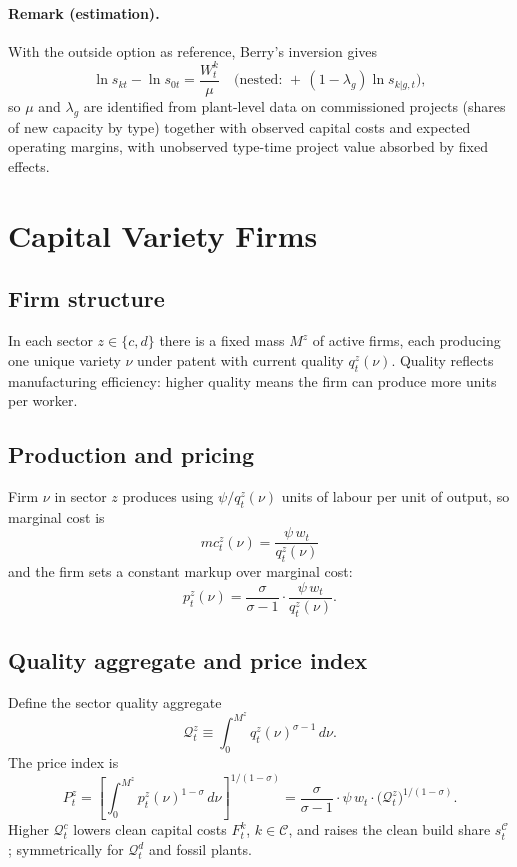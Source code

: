 \documentclass[12pt]{article}
\begin{document}
\paragraph{Remark (estimation).}
With the outside option as reference, Berry's inversion gives
\[
\ln s_{kt}-\ln s_{0t}
=\frac{W^k_t}{\mu}
\quad\Big(\text{nested: }+\,(1-\lambda_g)\ln s_{k|g,t}\Big),
\]
so $\mu$ and $\lambda_g$ are identified from plant-level data on
commissioned projects (shares of new capacity by type) together with
observed capital costs and expected operating margins, with unobserved
type-time project value absorbed by fixed effects.

\section{Capital Variety Firms}\label{sec:varieties}

\subsection{Firm structure}

In each sector $z\in\{c,d\}$ there is a fixed mass $M^z$ of active
firms, each producing one unique variety $\nu$ under patent with current
quality $q^z_t(\nu)$. Quality reflects manufacturing efficiency: higher
quality means the firm can produce more units per worker.

\subsection{Production and pricing}

Firm $\nu$ in sector $z$ produces using $\psi/q^z_t(\nu)$ units of labour
per unit of output, so marginal cost is
\[
mc^z_t(\nu) = \frac{\psi\,w_t}{q^z_t(\nu)}
\]
and the firm sets a constant markup over marginal cost:
\[
p^z_t(\nu) = \frac{\sigma}{\sigma-1}\cdot\frac{\psi\,w_t}{q^z_t(\nu)} .
\]

\subsection{Quality aggregate and price index}

Define the sector quality aggregate
\[
\mathcal Q^z_t\equiv\int_0^{M^z} q^z_t(\nu)^{\sigma-1}\,d\nu .
\]
The price index is
\[
P^z_t = \left[\int_0^{M^z}
p^z_t(\nu)^{1-\sigma}\,d\nu\right]^{1/(1-\sigma)}
=\frac{\sigma}{\sigma-1}\cdot\psi\,w_t\cdot
\big(\mathcal Q^z_t\big)^{1/(1-\sigma)} .
\]
Higher $\mathcal Q^c_t$ lowers clean capital costs $F^k_t$,
$k\in\mathcal C$, and raises the clean build share
$s^{\mathcal C}_t$; symmetrically for $\mathcal Q^d_t$ and fossil
plants.
\end{document}
